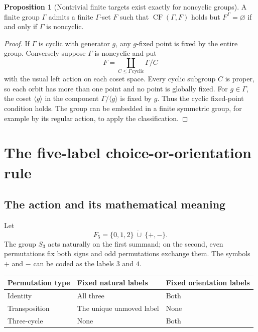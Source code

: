 \documentclass[11pt,letterpaper]{article}
\theoremstyle{definition}
\newtheorem{proposition}[definition]{Proposition}
\numberwithin{equation}{section}
\newcommand{\CF}{\operatorname{CF}}
\begin{document}
\begin{proposition}[Nontrivial finite targets exist exactly for noncyclic groups]\label{prop:noncyclic}
A finite group $\Gamma$ admits a finite $\Gamma$-set $F$ such that $\CF(\Gamma,F)$ holds but $F^\Gamma=\varnothing$ if and only if $\Gamma$ is noncyclic.
\end{proposition}

\begin{proof}
If $\Gamma$ is cyclic with generator $g$, any $g$-fixed point is fixed by the entire group. Conversely suppose $\Gamma$ is noncyclic and put
\[
 F=\coprod_{C\le\Gamma\,\text{cyclic}}\Gamma/C
\]
with the usual left action on each coset space. Every cyclic subgroup $C$ is proper, so each orbit has more than one point and no point is globally fixed. For $g\in\Gamma$, the coset $\langle g\rangle$ in the component $\Gamma/\langle g\rangle$ is fixed by $g$. Thus the cyclic fixed-point condition holds. The group can be embedded in a finite symmetric group, for example by its regular action, to apply the classification.
\end{proof}

\section{The five-label choice-or-orientation rule}\label{sec:hybrid}

\subsection{The action and its mathematical meaning}

Let
\begin{equation}\label{eq:F5}
 F_5=\{0,1,2\}\ \dot\cup\ \{+,-\}.
\end{equation}
The group $S_3$ acts naturally on the first summand; on the second, even permutations fix both signs and odd permutations exchange them. The symbols $+$ and $-$ can be coded as the labels $3$ and $4$.

\begin{center}
\begin{tabular}{@{}lll@{}}
\toprule
Permutation type & Fixed natural labels & Fixed orientation labels \\
\midrule
Identity & All three & Both \\
Transposition & The unique unmoved label & None \\
Three-cycle & None & Both \\
\bottomrule
\end{tabular}
\end{center}
\end{document}
